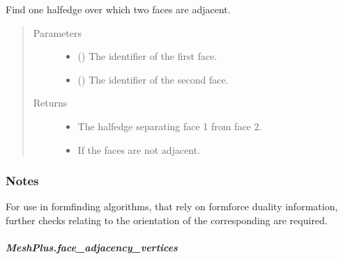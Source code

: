 \documentclass[letterpaper,10pt,english]{sphinxmanual}
\begin{document}
\begin{fulllineitems}
\begin{fulllineitems}
\label{\detokenize{api/generated/directional_clustering.mesh.MeshPlus.face_adjacency_halfedge:directional_clustering.mesh.MeshPlus.face_adjacency_halfedge}}
Find one half\sphinxhyphen{}edge over which two faces are adjacent.
\begin{quote}\begin{description}
\item[{Parameters}] \leavevmode\begin{itemize}
\item {} 
 () \textendash{} The identifier of the first face.

\item {} 
 () \textendash{} The identifier of the second face.

\end{itemize}

\item[{Returns}] \leavevmode
\begin{itemize}
\item {} 
 \textendash{} The half\sphinxhyphen{}edge separating face 1 from face 2.

\item {} 
 \textendash{} If the faces are not adjacent.

\end{itemize}


\end{description}\end{quote}
\subsubsection*{Notes}

For use in form\sphinxhyphen{}finding algorithms, that rely on form\sphinxhyphen{}force duality information,
further checks relating to the orientation of the corresponding are required.

\end{fulllineitems}



\subparagraph{MeshPlus.face\_adjacency\_vertices}
\label{\detokenize{api/generated/directional_clustering.mesh.MeshPlus.face_adjacency_vertices:meshplus-face-adjacency-vertices}}\label{\detokenize{api/generated/directional_clustering.mesh.MeshPlus.face_adjacency_vertices::doc}}


\end{fulllineitems}
\end{document}
